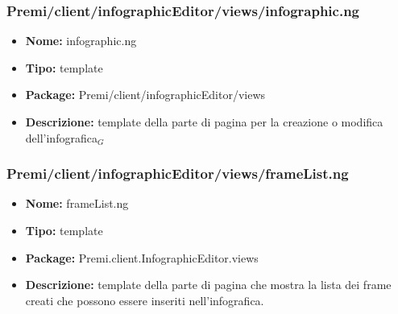 \subsubsection{Premi/client/infographicEditor/views/infographic.ng}
\begin{itemize}
  \item[] \textbf{Nome:} infographic.ng
  \item[] \textbf{Tipo:} template
  \item[] \textbf{Package:} Premi/client/infographicEditor/views
  \item[] \textbf{Descrizione:}  template della parte di pagina per la creazione o modifica dell'infografica$_G$
\end{itemize}
\subsubsection{Premi/client/infographicEditor/views/frameList.ng}
\begin{itemize}
  \item[] \textbf{Nome:} frameList.ng
  \item[] \textbf{Tipo:} template
  \item[] \textbf{Package:} Premi.client.InfographicEditor.views
  \item[] \textbf{Descrizione:} template della parte di pagina che mostra la lista dei frame creati che possono essere inseriti nell'infografica.
\end{itemize}
